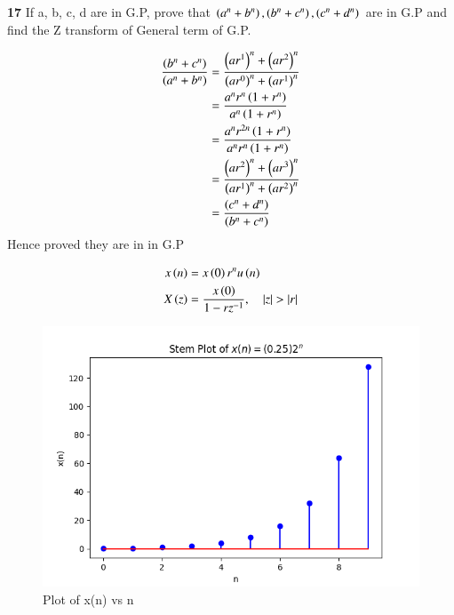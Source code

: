 \documentclass[journal,12pt,twocolumn]{IEEEtran}
\theoremstyle{remark}
\begin{document}


\vspace{3cm}

\title{}
\author{EE23BTECH11047 - Deepakreddy P
}
\maketitle
\newpage
\bigskip

\noindent \textbf{17} \quad 
If a, b, c, d are in G.P, prove that 
$ \left(a^{n} + b^{n}\right),\left(b^{n} + c^{n}\right),\left(c^{n} + d^{n}\right) $ are in G.P and find the Z transform of General term of G.P.\\
\solution

\begin{center}
    \begin{table}[ht]
        
    \end{table}
\end{center}

\begin{align} 
\frac{\left(b^n + c^n\right)}{\left(a^n + b^n\right)}  
&= \frac{\left(ar^1\right)^n + \left(ar^2\right)^n}{\left(ar^0\right)^n + \left(ar^1\right)^n}\\
&= \frac{a^n r^n \left(1 + r^n\right)}{a^n \left(1 + r^n\right)} \\
&= \frac{a^n r^{2n} \left(1 + r^n\right)}{a^n r^n \left(1 + r^n\right)}\\
&= \frac{\left(ar^2\right)^n + \left(ar^3\right)^n}{\left(ar^1\right)^n + \left(ar^2\right)^n}\\
&= \frac{\left(c^n + d^n\right)}{\left(b^n + c^n\right)}
\end{align}
Hence proved they are in in G.P

\begin{align}
    x\brak{n} &= x\brak{0}r^{n} u\brak{n}\\
    X\brak{z} &= \frac{x\brak{0}}{1-rz^{-1}}, \quad |z|>|r|
\end{align}
\newpage
\begin{figure}[h]
   \centering
   \includegraphics[width=1\columnwidth]{figs/gp.png}
   \caption{Plot of x(n) vs n}
   \label{fig: Stem plot of x(n)}
\end{figure}
\end{document}
